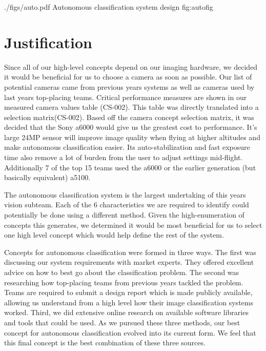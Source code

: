 \documentclass[]{auvsi_doc}
\begin{document}
\AUVSIFigure
{./figs/auto.pdf}
{\textwidth}
{Autonomous classification system design}
{fig:autofig}

\section{Justification}

Since all of our high-level concepts depend on our imaging hardware, we decided it would be beneficial for us to choose a camera as 
soon as possible. Our list of potential cameras came from previous years systems as well as cameras used by last years top-placing 
teams. Critical performance measures are shown in our measured camera values table (CS-002). This table was directly translated 
into a selection matrix(CS-002). Based off the camera concept selection matrix, it was decided that the Sony a6000 would give us 
the greatest cost to performance. It's large 24MP sensor will improve image quality when flying at higher altitudes and make 
autonomous classification easier. Its auto-stabilization and fast exposure time also remove a lot of burden from the user to adjust 
settings mid-flight. Additionally 7 of the top 15 teams used the a6000 or the earlier generation (but basically equivalent) a5100.

The autonomous classification system is the largest undertaking of this years vision subteam. Each of the 6 characteristics we are 
required to identify could potentially be done using a different method. Given the high-enumeration of concepts this generates, we 
determined it would be most beneficial for us to select one high level concept which would help define the rest of the system.

Concepts for autonomous classification were formed in three ways. The first was discussing our system requirements with market experts. 
They offered excellent advice on how to best go about the classification problem. The second was researching how top-placing teams from 
previous years tackled the problem. Teams are required to submit a design report which is made publicly available, allowing us understand 
from a high level how their image classification systems worked. Third, we did extensive online research on available software libraries 
and tools that could be used. As we pursued these three methods, our best concept for autonomous classification evolved into its current 
form. We feel that this final concept is the best combination of these three sources.
\end{document}
